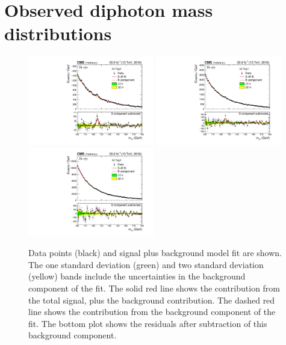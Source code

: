 \chapter{Observed diphoton mass distributions}
\label{app:massplots}

\begin{figure}[hptb]
  \centering
  \includegraphics[width=0.49\textwidth]{Figures/Appendices/_forAppendix2016ch1_RECO_0J_Tag0_13TeV.pdf}
  \includegraphics[width=0.49\textwidth]{Figures/Appendices/_forAppendix2016ch1_RECO_0J_Tag1_13TeV.pdf}
  \includegraphics[width=0.49\textwidth]{Figures/Appendices/_forAppendix2016ch1_RECO_0J_Tag2_13TeV.pdf}
  \caption[Signal plus background fits to data.]
  {
    Data points (black) and signal plus background model fit are shown. 
    The one standard deviation (green) and two standard deviation (yellow) bands 
    include the uncertainties in the background component of the fit. 
    The solid red line shows the contribution from the total signal, plus the background contribution. 
    The dashed red line shows the contribution from the background component of the fit. 
    The bottom plot shows the residuals after subtraction of this background component.
  }
\end{figure}

